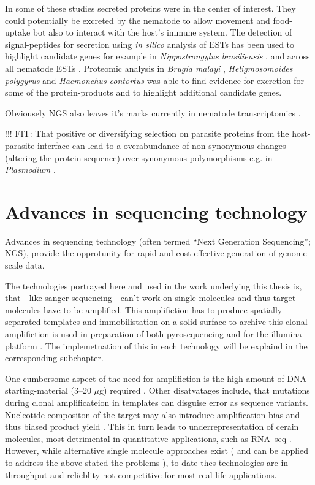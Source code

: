 In some of these studies secreted proteins were in the center of
interest. They could potentially be excreted by the nematode to allow
movement and food-uptake bot also to interact with the host's immune
system. The detection of signal-peptides for secretion using
\textit{in silico} analysis of ESTs has been used to highlight
candidate genes for example in \textit{Nippostrongylus brasiliensis}
\cite{harcus_signal_2004}, and across all nematode ESTs
\cite{nagaraj_needles_2008}. Proteomic analysis in \textit{Brugia
  malayi} \cite{pmid19352421,pmid18958170}, \textit{Heligmosomoides
  polygyrus} \cite{pmid21722761} and \textit{Haemonchus contortus}
\cite{pmid12576473} was able to find evidence for excretion for some
of the protein-products and to highlight additional candidate genes.

Obviousely NGS also leaves it's marks currently in nematode
transcriptomics \cite{pmid22044053}.


!!! FIT: 
That positive or diversifying selection on parasite proteins from the
host-parasite interface can lead to a overabundance of non-synonymous
changes (altering the protein sequence) over synonymous polymorphisms
e.g. in \textit{Plasmodium} \cite{pmid7630387}.

\section{Advances in sequencing technology}
\label{sec:ad-seq}

Advances in sequencing technology (often termed ``Next Generation
Sequencing''; NGS), provide the opprotunity for rapid and
cost-effective generation of genome-scale data. 

The technologies portrayed here and used in the work underlying this
thesis is, that - like sanger sequencing - can't work on single
molecules and thus target molecules have to be amplified. This
amplifiction has to produce spatially separated templates and
immobilistation on a solid surface to archive this clonal amplifiction
is used in preparation of both pyrosequencing and for the
illumina-platform \cite{pmid19997069}. The implemetnation of this in
each technology will be explaind in the corresponding subchapter.

One cumbersome aspect of the need for amplifiction is the high amount
of DNA starting-material (3–20 $\mu$g) required
\cite{pmid19997069}. Other disatvatages include, that mutations during
clonal amplificateion in templates can disguise error as sequence
variants. Nucleotide compositon of the target may also introduce
amplification bias and thus biased product yield
\cite{pmid19327155}. This in turn leads to underrepresentation of
cerain molecules, most detrimental in quantitative applications, such
as RNA–seq \cite{pmid19015660}. However, while alternative single
molecule approaches exist (\cite{pmid21431759, pmid21572978} and can
be applied to address the above stated the problems
\cite{pmid21431761, pmid21957044}), to date thes technologies are in
throughput and relieblity not competitive for most real life
applications.

